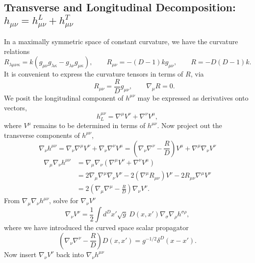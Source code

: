 \documentclass[10pt,letterpaper]{article}
\begin{document}
\subsection*{Transverse and Longitudinal Decomposition: $h_{\mu\nu} = h^L_{\mu\nu}+h^T_{\mu\nu}$}
In a maximally symmetric space of constant curvature, we have the curvature relations
\begin{equation}
R_{\lambda\mu\nu\kappa} = k(g_{\mu\nu}g_{\lambda\kappa} - g_{\lambda\nu}g_{\mu\kappa}),
\qquad R_{\mu\nu} = -(D-1)k g_{\mu\nu},\qquad  R = -D(D-1)k.
\end{equation}
It is convenient to express the curvature tensors in terms of $R$, via
\begin{equation}
\qquad R_{\mu\nu} = \frac{R}{D}g_{\mu\nu},\qquad \nabla_\mu R = 0.
\end{equation}
We posit the longitudinal component of $h^{\mu\nu}$ may be expressed as derivatives onto vectors,
\begin{equation}
h^{\mu\nu}_L = \nabla^\mu V^\nu  + \nabla^\nu V^\mu,
\end{equation}
where $V^{\mu}$ remains to be determined in terms of $h^{\mu\nu}$.
Now project out the transverse components of $h^{\mu\nu}$,
\begin{equation}
\nabla_\nu h^{\mu\nu} = \nabla_\nu \nabla^\mu V^\nu + \nabla_\nu \nabla^\nu V^\mu
= \left(\nabla_\nu\nabla^\nu - \frac{R}{D}\right)V^\mu + \nabla^\mu \nabla_\nu V^\nu 
\end{equation}
\begin{align}
\nabla_\mu\nabla_\nu h^{\mu\nu} &= \nabla_\mu\nabla_\nu( \nabla^\mu V^\nu + \nabla^\nu V^\mu)
\nonumber\\
& = 
 2 \nabla_\mu \nabla^\mu \nabla_\nu V^\nu - 2(\nabla^\mu R_{\mu\nu})V^\nu - 2 R_{\mu\nu} \nabla^\mu V^\nu
\nonumber\\
&
=  2\left(
\nabla_\mu \nabla^\mu - \frac{R}{D}\right) \nabla_\nu V^\nu.
\end{align}
From $\nabla_\mu\nabla_\nu h^{\mu\nu}$, solve for $\nabla_\nu V^\nu$
\begin{equation}
\nabla_\nu V^\nu = \frac12 \int d^Dx' \sqrt{g}\ D(x,x') \nabla_\sigma\nabla_\rho h^{\sigma\rho},
\end{equation}
where we have introduced the curved space scalar propagator
\begin{equation}
\left( \nabla_\nu \nabla^\nu -\frac{R}{D} \right)D(x,x') = g^{-1/2} \delta^D(x-x').
\end{equation}
Now insert $\nabla_\nu V^\nu$ back into $\nabla_\nu h^{\mu\nu}$
\end{document}
